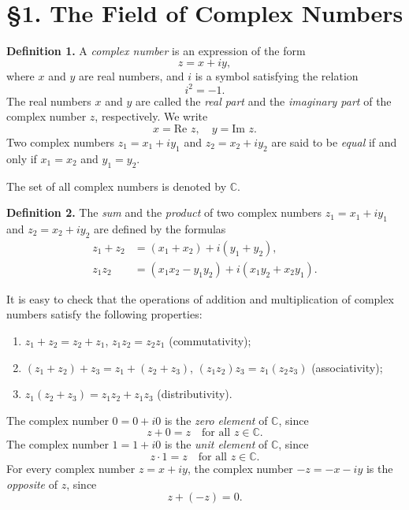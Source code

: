 \section*{§1. The Field of Complex Numbers}

\textbf{Definition 1.} A \textit{complex number} is an expression of the form
\[
z = x + iy,
\]
where $x$ and $y$ are real numbers, and $i$ is a symbol satisfying the relation
\[
i^{2} = -1.
\]
The real numbers $x$ and $y$ are called the \textit{real part} and the \textit{imaginary part} of the complex number $z$, respectively. We write
\[
x = \text{Re } z, \quad y = \text{Im } z.
\]
Two complex numbers $z_{1} = x_{1} + iy_{1}$ and $z_{2} = x_{2} + iy_{2}$ are said to be \textit{equal} if and only if $x_{1} = x_{2}$ and $y_{1} = y_{2}$.

The set of all complex numbers is denoted by $\mathbb{C}$.

\textbf{Definition 2.} The \textit{sum} and the \textit{product} of two complex numbers $z_{1} = x_{1} + iy_{1}$ and $z_{2} = x_{2} + iy_{2}$ are defined by the formulas
\begin{align*}
z_{1} + z_{2} &= (x_{1} + x_{2}) + i(y_{1} + y_{2}), \\
z_{1} z_{2} &= (x_{1}x_{2} - y_{1}y_{2}) + i(x_{1}y_{2} + x_{2}y_{1}).
\end{align*}

It is easy to check that the operations of addition and multiplication of complex numbers satisfy the following properties:
\begin{enumerate}
\item[(i)] $z_{1} + z_{2} = z_{2} + z_{1}$, $z_{1}z_{2} = z_{2}z_{1}$ \hfill (commutativity);
\item[(ii)] $(z_{1} + z_{2}) + z_{3} = z_{1} + (z_{2} + z_{3})$, $(z_{1}z_{2})z_{3} = z_{1}(z_{2}z_{3})$ \hfill (associativity);
\item[(iii)] $z_{1}(z_{2} + z_{3}) = z_{1}z_{2} + z_{1}z_{3}$ \hfill (distributivity).
\end{enumerate}
The complex number $0 = 0 + i0$ is the \textit{zero element} of $\mathbb{C}$, since
\[
z + 0 = z \quad \text{for all } z \in \mathbb{C}.
\]
The complex number $1 = 1 + i0$ is the \textit{unit element} of $\mathbb{C}$, since
\[
z \cdot 1 = z \quad \text{for all } z \in \mathbb{C}.
\]
For every complex number $z = x + iy$, the complex number $-z = -x - iy$ is the \textit{opposite} of $z$, since
\[
z + (-z) = 0.
\]